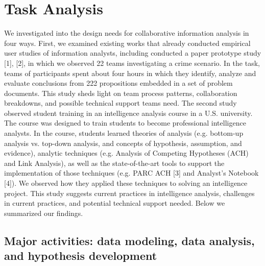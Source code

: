 \section{Task Analysis}

We investigated into the design needs for collaborative information analysis in four ways. First, we examined existing works that already conducted empirical user studies of information analysts, including \cite{Chin2009,Borge2012,Borge2014,Carroll2013,Pirolli2005} conducted a paper prototype study [1], [2], in which we observed 22 teams investigating a crime scenario. In the task, teams of participants spent about four hours in which they identify, analyze and evaluate conclusions from 222 propositions embedded in a set of problem documents. This study sheds light on team process patterns, collaboration breakdowns, and possible technical support teams need. The second study observed student training in an intelligence analysis course in a U.S. university. The course was designed to train students to become professional intelligence analysts. In the course, students learned theories of analysis (e.g. bottom-up analysis vs. top-down analysis, and concepts of hypothesis, assumption, and evidence), analytic techniques (e.g. Analysis of Competing Hypotheses (ACH) and Link Analysis), as well as the state-of-the-art tools to support the implementation of those techniques (e.g. PARC ACH [3] and Analyst’s Notebook [4]). We observed how they applied these techniques to solving an intelligence project. This study suggests current practices in intelligence analysis, challenges in current practices, and potential technical support needed.  Below we summarized our findings.

\subsection{Major activities: data modeling, data analysis, and hypothesis development}

